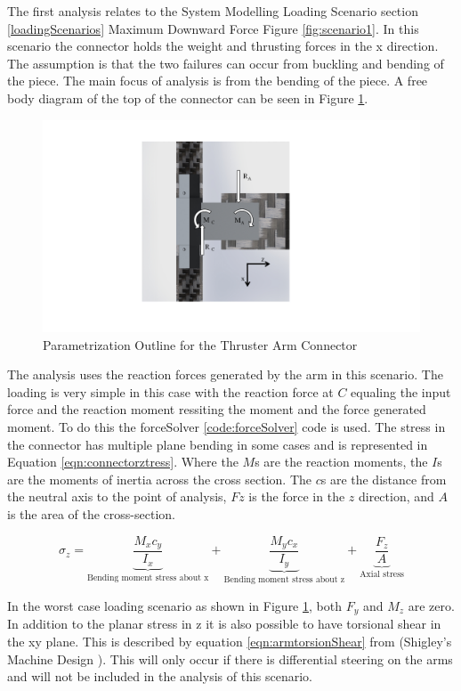 \documentclass[../main.tex]{subfiles}
\begin{document}
The first analysis relates to the System Modelling Loading Scenario section \ref{loadingScenarios} Maximum Downward Force Figure \ref{fig:scenario1}. In this scenario the connector holds the weight and thrusting forces in the x direction. The assumption is that the two failures can occur from buckling and bending of the piece. The main focus of analysis is from the bending of the piece. A free body diagram of the top of the connector can be seen in Figure \ref{fig:armConnector}. 

\begin{figure}[H]
	\centering
	\includegraphics[page={1}, width=.7\linewidth]{img/analysis/arm/armConnector.pdf}
	\caption{Parametrization Outline for the Thruster Arm Connector}
	\label{fig:armConnector}
\end{figure}

The analysis uses the reaction forces generated by the arm in this scenario. The loading is very simple in this case with the reaction force at $C$ equaling the input force and the reaction moment ressiting the moment and the force generated moment. To do this the forceSolver \ref{code:forceSolver} code is used. The stress in the connector has multiple plane bending in some cases and is represented in Equation \ref{eqn:connectorztress}. Where the $M$s are the reaction moments, the $I$s are the moments of inertia across the cross section. The $c$s are the distance from the neutral axis to the point of analysis, $Fz$ is the force in the $z$ direction, and $A$ is the area of the cross-section.

\begin{equation}
\label{eqn:connectorztress}
\sigma_{z}=  \underbrace{\frac{M_{x}c_y}{I_x}}_\text{Bending moment stress about x} + \underbrace{\frac{M_{y}c_x}{I_y}}_\text{Bending moment stress about z} + \underbrace{\frac{F_z}{A}}_\text{Axial stress} 
\end{equation}

In the worst case loading scenario as shown in Figure \ref{fig:armConnector}, both $F_y$ and $M_z$ are zero. In addition to the planar stress in z it is also possible to have torsional shear in the xy plane. This is described by equation \ref{eqn:armtorsionShear} from {(Shigley's Machine Design \cite[102]{shigley})}. This will only occur if there is differential steering on the arms and will not be included in the analysis of this scenario.
\end{document}
